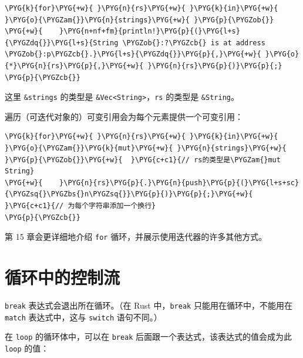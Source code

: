 \begin{Verbatim}[commandchars=\\\{\},breaklines=true,breakanywhere=true,fontsize=\codefont,xleftmargin=17bp]
\PYG{k}{for}\PYG{+w}{ }\PYG{n}{rs}\PYG{+w}{ }\PYG{k}{in}\PYG{+w}{ }\PYG{o}{\PYGZam{}}\PYG{n}{strings}\PYG{+w}{ }\PYG{p}{\PYGZob{}}
\PYG{+w}{    }\PYG{n+nf+fm}{println!}\PYG{p}{(}\PYG{l+s}{\PYGZdq{}}\PYG{l+s}{String \PYGZob{}:?\PYGZcb{} is at address \PYGZob{}:p\PYGZcb{}.}\PYG{l+s}{\PYGZdq{}}\PYG{p}{,}\PYG{+w}{ }\PYG{o}{*}\PYG{n}{rs}\PYG{p}{,}\PYG{+w}{ }\PYG{n}{rs}\PYG{p}{)}\PYG{p}{;}
\PYG{p}{\PYGZcb{}}
\end{Verbatim}

这里 \texttt{\&strings} 的类型是 \texttt{\&Vec<String>}，\texttt{rs} 的类型是 \texttt{\&String}。

遍历（可迭代对象的）可变引用会为每个元素提供一个可变引用：

\begin{Verbatim}[commandchars=\\\{\},breaklines=true,breakanywhere=true,fontsize=\codefont,xleftmargin=17bp]
\PYG{k}{for}\PYG{+w}{ }\PYG{n}{rs}\PYG{+w}{ }\PYG{k}{in}\PYG{+w}{ }\PYG{o}{\PYGZam{}}\PYG{k}{mut}\PYG{+w}{ }\PYG{n}{strings}\PYG{+w}{ }\PYG{p}{\PYGZob{}}\PYG{+w}{  }\PYG{c+c1}{// rs的类型是\PYGZam{}mut String}
\PYG{+w}{    }\PYG{n}{rs}\PYG{p}{.}\PYG{n}{push}\PYG{p}{(}\PYG{l+s+sc}{\PYGZsq{}\PYGZbs{}n\PYGZsq{}}\PYG{p}{)}\PYG{p}{;}\PYG{+w}{  }\PYG{c+c1}{// 为每个字符串添加一个换行}
\PYG{p}{\PYGZcb{}}
\end{Verbatim}

第 15 章会更详细地介绍 \texttt{for} 循环，并展示使用迭代器的许多其他方式。

\section{循环中的控制流}

\texttt{break} 表达式会退出所在循环。（在 Rust 中，\texttt{break} 只能用在循环中，不能用在 \texttt{match} 表达式中，这与 \texttt{switch} 语句不同。）

在 \texttt{loop} 的循环体中，可以在 \texttt{break} 后面跟一个表达式，该表达式的值会成为此 \texttt{loop} 的值：


